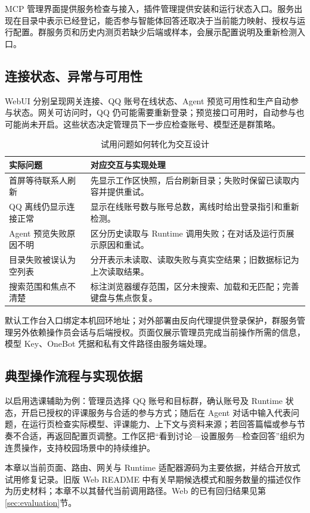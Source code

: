 MCP 管理界面提供服务检查与接入，插件管理提供安装和运行状态入口。服务出现在目录中表示已经登记，能否参与智能体回答还取决于当前能力映射、授权与运行配置。群服务页和历史内测页若缺少后端或样本，会展示配置说明及重新检测入口。

\subsection{连接状态、异常与可用性}
WebUI 分别呈现网关连接、QQ 账号在线状态、Agent 预览可用性和生产自动参与状态。网关可访问时，QQ 仍可能需要重新登录；预览接口可用时，自动参与也可能尚未开启。这些状态决定管理员下一步应检查账号、模型还是群策略。

\begin{table}[H]\centering
\caption{试用问题如何转化为交互设计}
\begin{tabularx}{\textwidth}{@{}L{34mm}Y@{}}\toprule
实际问题 & 对应交互与实现处理\\\midrule
首屏等待联系人刷新 & 先显示工作区快照，后台刷新目录；失败时保留已读取内容并提供重试。\\
QQ 离线仍显示连接正常 & 显示在线账号数与账号总数，离线时给出登录指引和重新检测。\\
Agent 预览失败原因不明 & 区分历史读取与 Runtime 调用失败；在对话及运行页展示原因和重试。\\
目录失败被误认为空列表 & 分开表示未读取、读取失败与真实空结果；旧数据标记为上次读取结果。\\
搜索范围和焦点不清楚 & 标注浏览器缓存范围，区分未搜索、加载和无匹配；完善键盘与焦点恢复。\\\bottomrule
\end{tabularx}
\end{table}

默认工作台入口绑定本机回环地址；对外部署由反向代理提供登录保护，群服务管理另外依赖操作员会话与后端授权。页面仅展示管理员完成当前操作所需的信息，模型 Key、OneBot 凭据和私有文件路径由服务端处理。

\subsection{典型操作流程与实现依据}
以启用选课辅助为例：管理员选择 QQ 账号和目标群，确认账号及 Runtime 状态，开启已授权的评课服务与合适的参与方式；随后在 Agent 对话中输入代表问题，在运行页检查实际模型、评课能力、上下文与资料来源；若回答篇幅或参与节奏不合适，再返回配置页调整。工作区把“看到讨论—设置服务—检查回答”组织为连贯操作，支持校园场景中的持续维护。

本章以当前页面、路由、网关与 Runtime 适配器源码为主要依据，并结合开放式试用修复记录。旧版 Web README 中有关早期候选模式和服务数量的描述仅作为历史材料；本章不以其替代当前调用路径。Web 的已有回归结果见第\ref{sec:evaluation}节。
